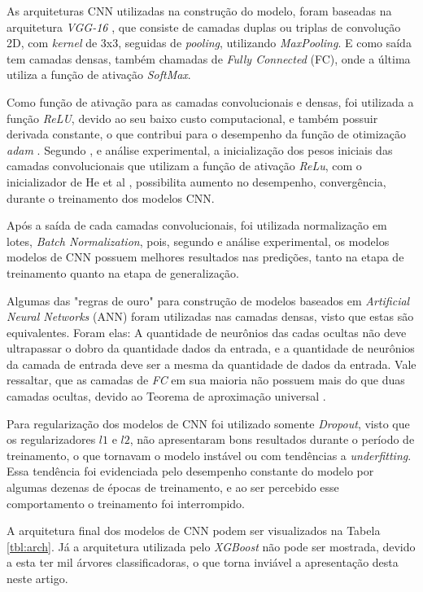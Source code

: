 As arquiteturas CNN utilizadas na construção do modelo, foram baseadas na arquitetura \emph{VGG-16} \cite{}, que consiste de camadas duplas ou triplas de convolução 2D, com \emph{kernel} de 3x3, seguidas de \emph{pooling}, utilizando \emph{MaxPooling}. E como saída tem camadas densas, também chamadas de \emph{Fully Connected} (FC), onde a última utiliza a função de ativação \emph{SoftMax}.

Como função de ativação para as camadas convolucionais e densas, foi utilizada a função \emph{ReLU}, devido ao seu baixo custo computacional, e também possuir derivada constante, o que contribui para o desempenho da função de otimização \emph{adam} \cite{}. Segundo \cite{}, e análise experimental, a inicialização dos pesos iniciais das camadas convolucionais que utilizam a função de ativação \emph{ReLu}, com o inicializador de He et al \cite{}, possibilita aumento no desempenho, convergência, durante o treinamento dos modelos CNN.

Após a saída de cada camadas convolucionais, foi utilizada normalização em lotes, \emph{Batch Normalization}, pois, segundo \cite{} e análise experimental, os modelos modelos de CNN possuem melhores resultados nas predições, tanto na etapa de treinamento quanto na etapa de generalização.

Algumas das "regras de ouro" \cite{} para construção de modelos baseados em \emph{Artificial Neural Networks} (ANN) foram utilizadas nas camadas densas, visto que estas são equivalentes. Foram elas: A quantidade de neurônios das cadas ocultas não deve ultrapassar o dobro da quantidade dados da entrada, e a quantidade de neurônios da camada de entrada deve ser a mesma da quantidade de dados da entrada. Vale ressaltar, que as camadas de \emph{FC} em sua maioria não possuem mais do que duas camadas ocultas, devido ao Teorema de aproximação universal \cite{}.

Para regularização dos modelos de CNN foi utilizado somente \emph{Dropout}, visto que os regularizadores $l1$ e $l2$, não apresentaram bons resultados durante o período de treinamento, o que tornavam o modelo instável ou com tendências a \emph{underfitting}. Essa tendência foi evidenciada pelo desempenho constante do modelo por algumas dezenas de épocas de treinamento, e ao ser percebido esse comportamento o treinamento foi interrompido.

A arquitetura final dos modelos de CNN podem ser visualizados na Tabela \ref{tbl:arch}. Já a arquitetura utilizada pelo \emph{XGBoost} não pode ser mostrada, devido a esta ter mil árvores classificadoras, o que torna inviável a apresentação desta neste artigo.



\fi
